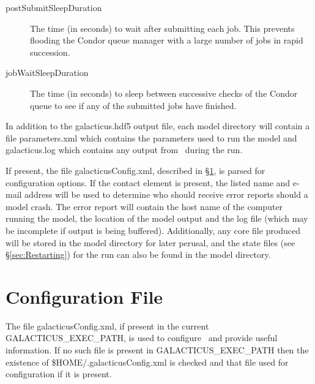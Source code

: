 \begin{description}
\begin{description}
\item[{\normalfont \ttfamily postSubmitSleepDuration}] The time (in seconds) to wait after submitting each job. This prevents flooding the Condor queue manager with a large number of jobs in rapid succession.
\item[{\normalfont \ttfamily jobWaitSleepDuration}] The time (in seconds) to sleep between successive checks of the Condor queue to see if any of the submitted jobs have finished.
\end{description}

\end{description}

In addition to the {\normalfont \ttfamily galacticus.hdf5} output file, each model directory will contain a file {\normalfont \ttfamily parameters.xml} which contains the parameters used to run the model and {\normalfont \ttfamily galacticus.log} which contains any output from \glc\ during the run.

If present, the file {\normalfont \ttfamily galacticusConfig.xml}, described in \S\ref{sec:ConfigFile}, is parsed for configuration options. If the {\normalfont \ttfamily contact} element is present, the listed name and e-mail address will be used to determine who should receive error reports should a model crash. The error report will contain the host name of the computer running the model, the location of the model output and the log file (which may be incomplete if output is being buffered). Additionally, any core file produced will be stored in the model directory for later perusal, and the state files (see \S\ref{sec:Restarting}) for the run can also be found in the model directory.

\section{Configuration File}\label{sec:ConfigFile}

The file {\normalfont \ttfamily galacticusConfig.xml}, if present in the current {\normalfont \ttfamily GALACTICUS\_EXEC\_PATH}, is used to configure \glc\ and provide useful information. If no such file is present in {\normalfont \ttfamily GALACTICUS\_EXEC\_PATH} then the existence of {\normalfont \ttfamily \$HOME/.galacticusConfig.xml} is checked and that file used for configuration if it is present.

